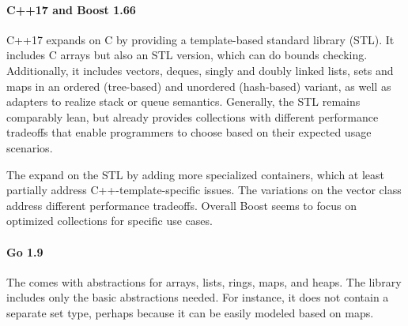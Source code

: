 \documentclass[sigconf, 10pt]{acmart}
\begin{document}
\paragraph{C++17 and Boost 1.66}

% 
% 

C++17\citep{Cpp17} expands on C
by providing a template-based standard library (STL).
It includes C arrays but also an STL version, which can do bounds checking.
Additionally, it includes vectors, deques, singly and doubly linked lists,
sets and maps in an ordered (tree-based) and unordered (hash-based) variant,
as well as adapters to realize stack or queue semantics.
Generally, the STL remains comparably lean,
but already provides collections with different performance tradeoffs
that enable programmers to choose based on their expected usage scenarios.

The 
expand on the STL by adding more specialized containers,
which at least partially address C++-template-specific issues.
The variations on the vector class address different performance tradeoffs.
Overall Boost seems to focus on optimized collections
for specific use cases.

\paragraph{Go 1.9}


The 
comes with abstractions for arrays,
lists, rings, maps, and heaps.
The library includes only the basic abstractions needed.
For instance, it does not contain a separate set type,
perhaps because it can be easily modeled based on maps.
\end{document}
